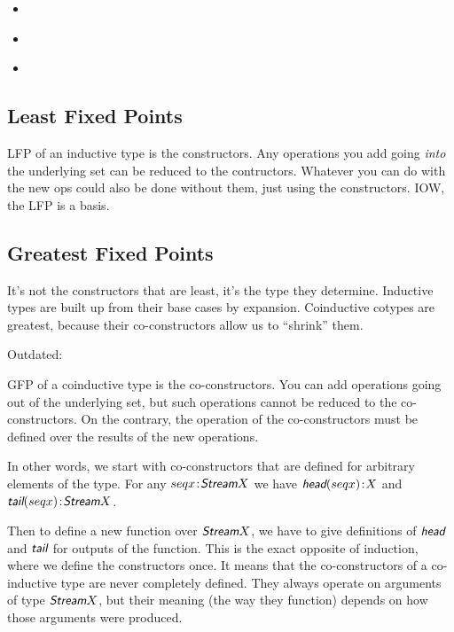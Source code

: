 \documentclass{article}
\begin{document}
\begin{itemize}
\item {} \cite{lawvere1997conceptual}
\item {} \cite{davey2002introduction}
\item {} \cite{stoy1977denotational}
\end{itemize}

\subsection{Least Fixed Points}

LFP of an inductive type is the constructors. Any operations you add
going \textit{into} the underlying set can be reduced to the
contructors. Whatever you can do with the new ops could also be done
without them, just using the constructors. IOW, the LFP is a basis.

\subsection{Greatest Fixed Points}

It's not the constructors that are least, it's the type they
determine. Inductive types are built up from their base cases by
expansion. Coinductive cotypes are greatest, because their
co-constructors allow us to ``shrink'' them.

Outdated:

GFP of a coinductive type is the co-constructors. You can add
operations going out of the underlying set, but such operations cannot
be reduced to the co-constructors. On the contrary, the operation of
the co-constructors must be defined over the results of the new
operations.

In other words, we start with co-constructors that are defined for
arbitrary elements of the type. For any \(\tj{seq{x}}{\Stream X}\) we have
\(\tj{\head(seq{x})}{X}\) and \(\tj{\tail(seq{x})}{\Stream X}\).

Then to define a new function over \(\Stream X\), we have to give
definitions of \(\head\) and \(\tail\) for outputs of the function.
This is the exact opposite of induction, where we define the
constructors once. It means that the co-constructors of a co-inductive
type are never completely defined. They always operate on arguments of
type \(\Stream X\), but their meaning (the way they function) depends
on how those arguments were produced.
\end{document}
